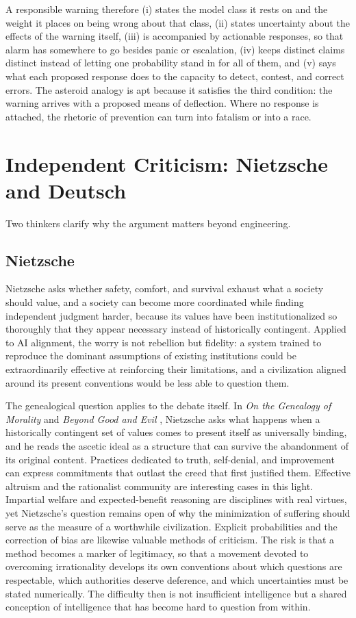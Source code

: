 \documentclass[11pt]{article}
\begin{document}
A responsible warning therefore (i) states the model class it rests on and the weight it places on being wrong about that class, (ii) states uncertainty about the effects of the warning itself, (iii) is accompanied by actionable responses, so that alarm has somewhere to go besides panic or escalation, (iv) keeps distinct claims distinct instead of letting one probability stand in for all of them, and (v) says what each proposed response does to the capacity to detect, contest, and correct errors. The asteroid analogy is apt because it satisfies the third condition: the warning arrives with a proposed means of deflection. Where no response is attached, the rhetoric of prevention can turn into fatalism or into a race.

\section{Independent Criticism: Nietzsche and Deutsch}\label{sec:crit}

Two thinkers clarify why the argument matters beyond engineering.

\subsection{Nietzsche}

Nietzsche asks whether safety, comfort, and survival exhaust what a society should value, and a society can become more coordinated while finding independent judgment harder, because its values have been institutionalized so thoroughly that they appear necessary instead of historically contingent. Applied to AI alignment, the worry is not rebellion but fidelity: a system trained to reproduce the dominant assumptions of existing institutions could be extraordinarily effective at reinforcing their limitations, and a civilization aligned around its present conventions would be less able to question them.

The genealogical question applies to the debate itself. In \emph{On the Genealogy of Morality} and \emph{Beyond Good and Evil} \cite{nietzsche1887,nietzsche1886}, Nietzsche asks what happens when a historically contingent set of values comes to present itself as universally binding, and he reads the ascetic ideal as a structure that can survive the abandonment of its original content. Practices dedicated to truth, self-denial, and improvement can express commitments that outlast the creed that first justified them. Effective altruism and the rationalist community are interesting cases in this light. Impartial welfare and expected-benefit reasoning are disciplines with real virtues, yet Nietzsche's question remains open of why the minimization of suffering should serve as the measure of a worthwhile civilization. Explicit probabilities and the correction of bias are likewise valuable methods of criticism. The risk is that a method becomes a marker of legitimacy, so that a movement devoted to overcoming irrationality develops its own conventions about which questions are respectable, which authorities deserve deference, and which uncertainties must be stated numerically. The difficulty then is not insufficient intelligence but a shared conception of intelligence that has become hard to question from within.
\end{document}
